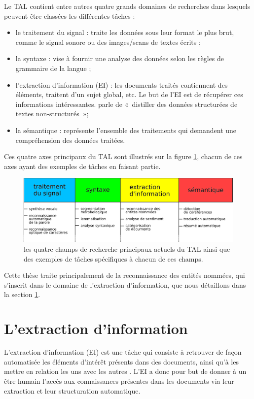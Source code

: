 \documentclass[12pt,a4paper,times,twoside,openright]{report}
\begin{document}
Le TAL contient entre autres quatre grands domaines de recherches dans lesquels peuvent être classées les différentes tâches :
\begin{itemize}
    \item le traitement du signal : traite les données sous leur format le plus brut, comme le signal sonore ou des images/scans de textes écrits ;
    \item la syntaxe : vise à fournir une analyse des données selon les règles de grammaire de la langue ;
    \item l'extraction d'information (EI) : les documents traités contiennent des éléments, traitent d'un sujet global, etc. Le but de l'EI est de récupérer ces informations intéressantes. \citet{mccallum2005information} parle de «\ distiller des données structurées de textes non-structurés\ »;
    \item la sémantique : représente l'ensemble des traitements qui demandent une compréhension des données traitées.
\end{itemize}

Ces quatre axes principaux du TAL sont illustrés sur la figure \ref{fig:tal-timeline}, chacun de ces axes ayant des exemples de tâches en faisant partie.

\begin{figure}[ht!]
    \centering
    \includegraphics[scale=1.0]{images/TAL/frise1-TAL-couleurs}
    \caption{les quatre champs de recherche principaux actuels du TAL ainsi que des exemples de tâches spécifiques à chacun de ces champs.}
    \label{fig:tal-timeline}
\end{figure}

Cette thèse traite principalement de la reconnaissance des entités nommées, qui s'inscrit dans le domaine de l'extraction d'information, que nous détaillons dans la section \ref{sec:EI-introduction}.


    
    \section{L'extraction d'information}
    \label{sec:EI-introduction}
L'extraction d'information (EI) est une tâche qui consiste à retrouver de façon automatisée les éléments d'intérêt présents dans des documents, ainsi qu'à les mettre en relation les uns avec les autres \citep{yangarber2000automatic}. L'EI a donc pour but de donner à un être humain l'accès aux connaissances présentes dans les documents via leur extraction et leur structuration automatique.
\end{document}
